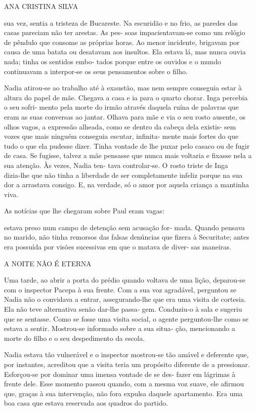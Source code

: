 ANA CRISTINA SILVA

sua vez, sentia a tristeza de Bucareste. Na escuridão e no frio, as
paredes das casas pareciam não ter arestas. As pes‑ soas
impacientavam‑se como um relógio de pêndulo que consome as próprias
horas. Ao menor incidente, brigavam por causa de uma batata ou desatavam
aos insultos. Ela estava lá, mas nunca ouvia nada; tinha os sentidos
embo‑ tados porque entre os ouvidos e o mundo continuavam a interpor‑se
os seus pensamentos sobre o filho.

Nadia atirou‑se ao trabalho até à exaustão, mas nem sempre conseguia
estar à altura do papel de mãe. Chegava a casa e ia para o quarto
chorar. Inga percebia o seu sofri‑ mento pela morte do irmão através
daquela ruína de palavras que eram as suas conversas ao jantar. Olhava
para mãe e via o seu rosto ausente, os olhos vagos, a expressão alheada,
como se dentro da cabeça dela existis‑ sem vozes que mais ninguém
conseguia escutar, infinita‑ mente mais fortes do que tudo o que ela
pudesse dizer. Tinha vontade de lhe puxar pelo casaco ou de fugir de
casa. Se fugisse, talvez a mãe pensasse que nunca mais voltaria e
fixasse nela a sua atenção. Às vezes, Nadia ten‑ tava controlar‑se. O
rosto triste de Inga dizia‑lhe que não tinha a liberdade de ser
completamente infeliz porque na sua dor a arrastava consigo. E, na
verdade, só o amor por aquela criança a mantinha viva.

As notícias que lhe chegaram sobre Paul eram vagas:

estava preso num campo de detenção sem acusação for‑ mada. Quando
pensava no marido, não tinha remorsos das falsas denúncias que fizera à
Securitate; antes era possuída por visões sucessivas em que o matava de
diver‑ sas maneiras.

A NOITE NÃO É ETERNA

Uma tarde, ao abrir a porta do prédio quando voltava de uma lição,
deparou‑se com o inspector Pacepa à sua frente. Com a sua voz agradável,
perguntou se Nadia não o convidava a entrar, assegurando‑lhe que era uma
visita de cortesia. Ela não teve alternativa senão dar‑lhe passa‑ gem.
Conduziu‑o à sala e sugeriu que se sentasse. Como se fosse uma visita
social, o agente perguntou‑lhe como se estava a sentir. Mostrou‑se
informado sobre a sua situa‑ ção, mencionando a morte do filho e o seu
despedimento da escola.

Nadia estava tão vulnerável e o inspector mostrou‑se tão amável e
deferente que, por instantes, acreditou que a visita teria um propósito
diferente de a pressionar. Esforçou‑se por dominar uma imensa vontade de
se des‑ fazer em lágrimas à frente dele. Esse momento passou quando, com
a mesma voz suave, ele afirmou que, graças à sua intervenção, não fora
expulsa daquele apartamento. Era uma boa casa que estava reservada aos
quadros do partido.


